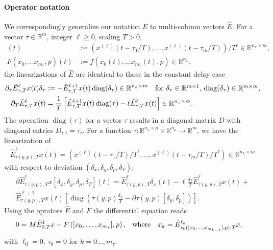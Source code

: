 \documentclass[11pt]{scrartcl}
\newcommand{\R}{\mathbb{R}}
\DeclareMathOperator{\diag}{diag}
\begin{document}
\paragraph{Operator notation}
We correspondingly generalize our
notation $E$ to multi-column vectors $\hat{E}$. For a vector
$\tau\in\R^m$, integer $\ell\geq0$, scaling $T>0$,
\begin{align*}
  [\hat{E}^\ell_{\tau,T}x](t)&:=\left(x^{(\ell)}(t-\tau_1/T),\ldots,x^{(\ell)}(t-\tau_m/T)\right)/T^\ell\in\R^{n_x\times m},\\
  F(x_0,\ldots x_{m_\tau},p)(t)&:=f(x_0(t),\ldots x_{m_\tau}(t),p)\in\R^{n_x},
\end{align*}
the linearizations of $\hat{E}$ are identical to those in the constant delay case
\begin{align*}
  \partial_\tau \hat{E}^\ell_{\tau,T}x(t)\delta_\tau&:=-\hat{E}^{\ell+1}_{\tau,T}x(t)\diag(\delta_\tau)\in\R^{n_x\times m}\mbox{\quad for $\delta_\tau\in\R^{m\times1}$, $\diag(\delta_\tau)\in\R^{m\times m}$,}\\
  \partial_T \hat{E}^\ell_{\tau,T}x(t)&=\frac{1}{T}\left[\hat{E}^{\ell+1}_{\tau,T}x(t)\diag(\tau)-\ell \hat{E}^\ell_{\tau,T}x(t)\right]\in\R^{n_x\times m}\mbox{.}
\end{align*}
The operation $\diag(\tau)$ for a vector $\tau$ results in a diagonal
matrix $D$ with diagonal entries $D_{i,i}=\tau_i$. For a function
$\tau:\R^{n_x\times\mu}\times\R^{n_p}\to\R^m$, we have the
linearization of
\begin{align*}
  \hat{E}^\ell_{\tau(y,p),T}x(t)=\left(x^{(\ell)}(t-\tau_1/T)/T^\ell,\ldots,x^{(\ell)}(t-\tau_m/T)/T^\ell\right)\in\R^{n_x\times m}
\end{align*}
with respect to deviation $(\delta_x,\delta_y,\delta_p,\delta_T)$:
\begin{multline*}
  \partial\hat{E}^\ell_{\tau(y,p),T}x[\delta_x,\delta_y,\delta_p,\delta_T](t)=
  \hat{E}^\ell_{\tau(y,p),T}\delta_x(t)-\ell\frac{\delta_T}{T}
  \hat{E}^\ell_{\tau(y,p),T}x(t)+
  \\
  \hat{E}^{\ell+1}_{\tau(y,p),T}x(t)\left[\diag\left(\tau(y,p)\frac{\delta_T}{T}-\partial\tau(y,p)[\delta_y,\delta_p]\right)\right].
\end{multline*}
Using the oprators $\hat{E}$ and $F$ the differential equation reads
\begin{align}
  \label{eq:po:sddde:EF}
  0&=M\hat{E}^1_{0,T}x-F\left([x_0,\ldots,x_{m_\tau}],p\right)\mbox{,\quad where\quad}
  x_k=\hat{E}^{\ell_k}_{\tau_k([x_0,\ldots,x_{m_{k-1}}],p),T}x\mbox{,}
\end{align}
with $\ell_0=0$, $\tau_0=0$ for $k=0\ldots,m_\tau$.
\end{document}
